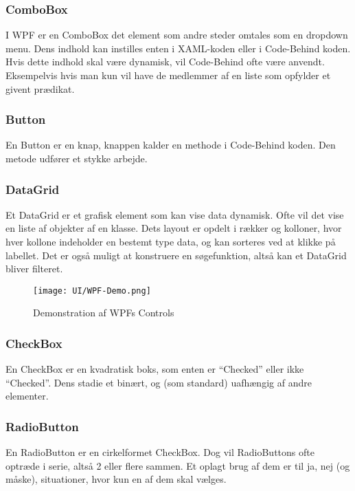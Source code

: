\subsubsection*{ComboBox}
I WPF er en ComboBox det element som andre steder omtales som en dropdown menu. 
Dens indhold kan instilles enten i XAML-koden eller i Code-Behind koden.
Hvis dette indhold skal være dynamisk, vil Code-Behind ofte være anvendt.
Eksempelvis hvis man kun vil have de medlemmer af en liste som opfylder et givent prædikat. 

\subsubsection*{Button}
En Button er en knap, knappen kalder en methode i Code-Behind koden. 
Den metode udfører et stykke arbejde.

\subsubsection*{DataGrid}
Et DataGrid er et grafisk element som kan vise data dynamisk.
Ofte vil det vise en liste af objekter af en klasse.
Dets layout er opdelt i rækker og kolloner, hvor hver kollone indeholder en bestemt type data, og kan sorteres ved at klikke på labellet.
Det er også muligt at konstruere en søgefunktion, altså kan et DataGrid bliver filteret.

\begin{wrapfigure}[22]{R}{0.5\textwidth}
    \label{img:wpfdemo}
    \vspace{-30pt}
    \begin{center}
        \texttt{[image: UI/WPF-Demo.png]}
    \end{center}
    \vspace{-15pt}
    \caption{Demonstration af WPFs Controls}
    \vspace{-15pt}
\end{wrapfigure}

\subsubsection*{CheckBox}
En CheckBox er en kvadratisk boks, som enten er ``Checked'' eller ikke ``Checked''. 
Dens stadie et binært, og (som standard) uafhængig af andre elementer.

\subsubsection*{RadioButton}
En RadioButton er en cirkelformet CheckBox.
Dog vil RadioButtons ofte optræde i serie, altså 2 eller flere sammen.
Et oplagt brug af dem er til ja, nej (og måske), situationer, hvor kun en af dem skal vælges.

